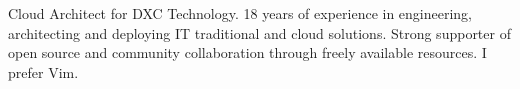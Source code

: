 
\begin{cvparagraph}

Cloud Architect for DXC Technology. 18 years of experience in engineering, architecting and deploying IT traditional and cloud solutions. Strong supporter of open source and community collaboration through freely available resources. I prefer Vim.
\end{cvparagraph}
